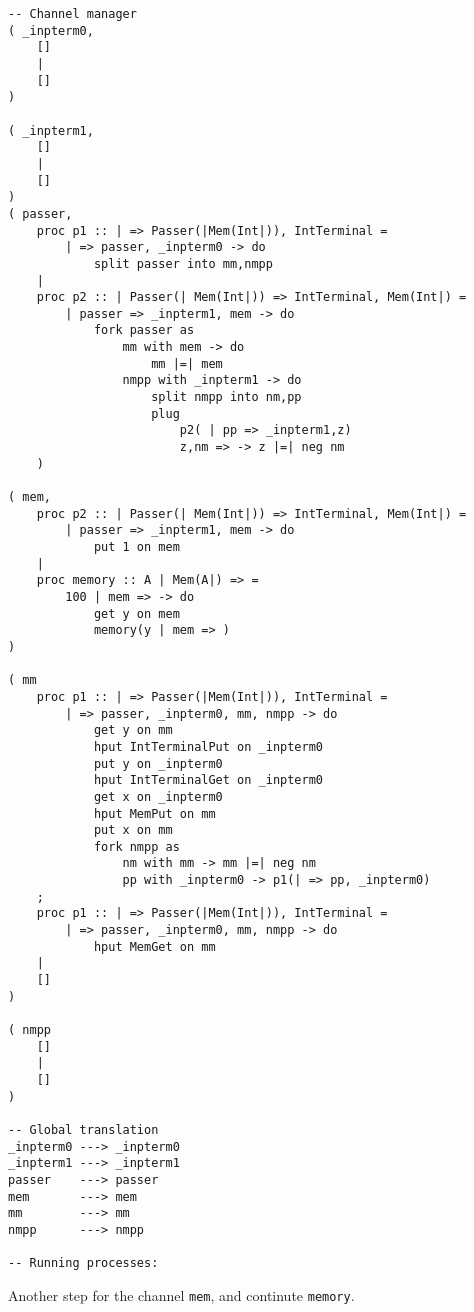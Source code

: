 \documentclass{article}
\theoremstyle{plain}%
\theoremstyle{definition}
\theoremstyle{remark}
\begin{document}
\begin{verbatim}
-- Channel manager
( _inpterm0,  
    []
    |
    []
)

( _inpterm1,  
    []
    |
    []
)
( passer,
    proc p1 :: | => Passer(|Mem(Int|)), IntTerminal = 
        | => passer, _inpterm0 -> do
            split passer into mm,nmpp 
    |
    proc p2 :: | Passer(| Mem(Int|)) => IntTerminal, Mem(Int|) =
        | passer => _inpterm1, mem -> do
            fork passer as
                mm with mem -> do
                    mm |=| mem
                nmpp with _inpterm1 -> do
                    split nmpp into nm,pp
                    plug
                        p2( | pp => _inpterm1,z)
                        z,nm => -> z |=| neg nm
    )

( mem,
    proc p2 :: | Passer(| Mem(Int|)) => IntTerminal, Mem(Int|) =
        | passer => _inpterm1, mem -> do
            put 1 on mem
    |
    proc memory :: A | Mem(A|) => =
        100 | mem => -> do
            get y on mem
            memory(y | mem => )
)

( mm
    proc p1 :: | => Passer(|Mem(Int|)), IntTerminal = 
        | => passer, _inpterm0, mm, nmpp -> do
            get y on mm
            hput IntTerminalPut on _inpterm0
            put y on _inpterm0
            hput IntTerminalGet on _inpterm0
            get x on _inpterm0
            hput MemPut on mm
            put x on mm
            fork nmpp as
                nm with mm -> mm |=| neg nm 
                pp with _inpterm0 -> p1(| => pp, _inpterm0)
    ;
    proc p1 :: | => Passer(|Mem(Int|)), IntTerminal = 
        | => passer, _inpterm0, mm, nmpp -> do
            hput MemGet on mm 
    |
    []
)

( nmpp
    []
    |
    []
)

-- Global translation
_inpterm0 ---> _inpterm0 
_inpterm1 ---> _inpterm1 
passer    ---> passer 
mem       ---> mem
mm        ---> mm
nmpp      ---> nmpp

-- Running processes:
\end{verbatim}

Another step for the channel \verb|mem|, and continute \verb|memory|.
\end{document}
